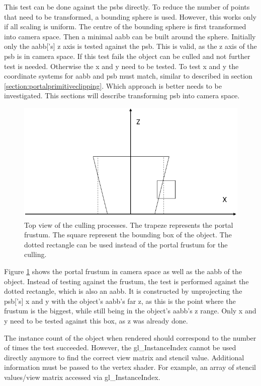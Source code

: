 This test can be done against the \glspl{psb} directly. To reduce the number of points that need to be transformed, a bounding sphere is used. However, this works only if all scaling is uniform. The centre of the bounding sphere is first transformed into camera space. Then a minimal \gls{aabb} can be built around the sphere. Initially only the \gls{aabb}['s] z axis is tested against the \gls{psb}. This is valid, as the z axis of the \gls{psb} is in camera space. If this test fails the object can be culled and not further test is needed. Otherwise the x and y need to be tested. To test x and y the coordinate systems for \gls{aabb} and \gls{psb} must match, similar to described in section \ref{section:portalprimitiveclipping}. Which approach is better needs to be investigated. This sections will describe transforming \gls{psb} into camera space. 

\begin{figure}[h]
	\includegraphics[width=\linewidth]{images/frustumbox.png}
	\caption{Top view of the culling processes. The trapeze represents the portal frustum. The square represent the bounding box of the object. The dotted rectangle can be used instead of the portal frustum for the culling. }
	\label{fig:frustumbox}
\end{figure}

Figure \ref{fig:frustumbox} shows the portal frustum in camera space as well as the \gls{aabb} of the object. Instead of testing against the frustum, the test is performed against the dotted rectangle, which is also an \gls{aabb}. It is constructed by unprojecting the \gls{psb}['s] x and y with the object's \gls{aabb}'s far z, as this is the point where the frustum is the biggest, while still being in the object's \gls{aabb}'s z range. Only x and y need to be tested against this box, as z was already done.


The instance count of the object when rendered should correspond to the number of times the test succeeded. However, the gl\_InstanceIndex cannot be used directly anymore to find the correct view matrix and stencil value. Additional information must be passed to the vertex shader. For example, an array of stencil values/view matrix accessed via gl\_InstanceIndex.

